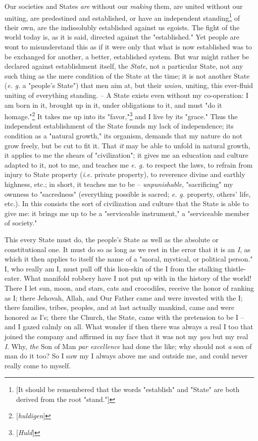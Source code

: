 Our societies and States \textit{are} without our \textit{making} them, are 
united without our uniting, are predestined and established, or have an 
independent standing\footnote{[It should be remembered that the words 
"{}establish"{} and "{}State"{} are both derived from the root "{}stand."{}]} 
of their own, are the indissolubly established against us egoists. The fight 
of the world today is, as it is said, directed against the "{}established."{} 
Yet people are wont to misunderstand this as if it were only that what is now 
established was to be exchanged for another, a better, established system. But 
war might rather be declared against establishment itself, the \textit{State}, 
not a particular State, not any such thing as the mere condition of the State 
at the time; it is not another State (\textit{e. g.} a "{}people's State"{}) 
that men aim at, but their \textit{union}, uniting, this ever-fluid uniting of 
everything standing. -- A State exists even without my co-operation: I am born 
in it, brought up in it, under obligations to it, and must "{}do it 
homage."{}\footnote{[\textit{huldigen}]} It takes me up into its 
"{}favor,"{}\footnote{[\textit{Huld}]} and I live by its "{}grace."{} Thus the 
independent establishment of the State founds my lack of independence; its 
condition as a "{}natural growth,"{} its organism, demands that my nature do 
not grow freely, but be cut to fit it. That \textit{it} may be able to unfold 
in natural growth, it applies to me the shears of "{}civilization"{}; it gives 
me an education and culture adapted to it, not to me, and teaches me 
\textit{e. g.} to respect the laws, to refrain from injury to State property 
(\textit{i.e.} private property), to reverence divine and earthly highness, 
etc.; in short, it teaches me to be -- \textit{unpunishable}, 
"{}sacrificing"{} my ownness to "{}sacredness"{} (everything possible is 
sacred; \textit{e. g.} property, others' life, etc.). In this consists the 
sort of civilization and culture that the State is able to give me: it brings 
me up to be a "{}serviceable instrument,"{} a "{}serviceable member of 
society."{}

This every State must do, the people's State as well as the absolute or 
constitutional one. It must do so as long as we rest in the error that it is 
an \textit{I}, as which it then applies to itself the name of a "{}moral, 
mystical, or political person."{} I, who really am I, must pull off this 
lion-skin of the I from the stalking thistle-eater. What manifold robbery have 
I not put up with in the history of the world! There I let sun, moon, and 
stars, cats and crocodiles, receive the honor of ranking as I; there Jehovah, 
Allah, and Our Father came and were invested with the I; there families, 
tribes, peoples, and at last actually mankind, came and were honored as I's; 
there the Church, the State, came with the pretension to be I -- and I gazed 
calmly on all. What wonder if then there was always a real I too that joined 
the company and affirmed in my face that it was not my \textit{you} but my 
real \textit{I}. Why, \textit{the} Son of Man \textit{par excellence} had done 
the like; why should not \textit{a} son of man do it too? So I saw my I always 
above me and outside me, and could never really come to myself.

